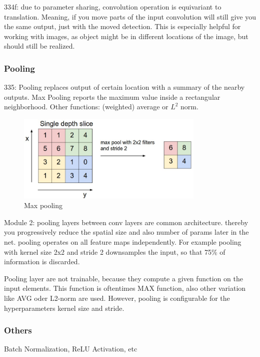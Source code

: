 334f: due to parameter sharing, convolution operation is equivariant to translation. Meaning, if you move parts of the input convolution will still give you the same output, just with the moved detection. This is especially helpful for working with images, as object might be in different locations of the image, but should still be realized.

\subsubsection{Pooling}
\cite{DLbook16}
335: Pooling replaces output of certain location with a summary of the nearby outputs. Max Pooling reports the maximum value inside a rectangular neighborhood. Other functions: (weighted) average or $L^2$ norm.


\begin{figure}[h]
    \centering
    \includegraphics[width=0.8\textwidth]{images/maxpool}
    \caption{Max pooling \cite{stanford_convnet}}
    \label{fig:pooling}
\end{figure}

\cite{stanford_convnet}
Module 2: pooling layers between conv layers are common architecture. thereby you progressively reduce the spatial size and also number of params later in the net. pooling operates on all feature maps independently. For example pooling with kernel size 2x2 and stride 2 downsamples the input, so that 75\% of information is discarded.

Pooling layer are not trainable, because they compute a given function on the input elements. This function is oftentimes MAX function, also other variation like AVG oder L2-norm are used. However, pooling is configurable for the hyperparameters kernel size and stride.

\subsubsection{Others}
Batch Normalization, ReLU Activation, etc

